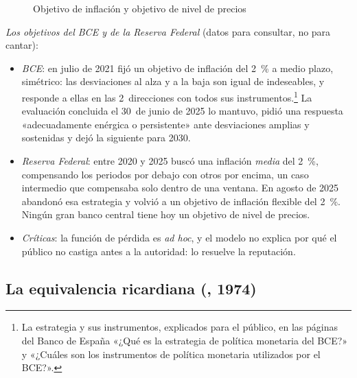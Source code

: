 \documentclass[11pt]{article}
\begin{document}
\begin{figure}[H]
\centering
\caption{Objetivo de inflación y objetivo de nivel de precios}\label{fig:objetivo-precios}
\end{figure}

\begin{anotaciones}
\emph{Los objetivos del BCE y de la Reserva Federal} (datos para consultar, no para cantar):
\begin{itemize}
\item \emph{BCE}: en julio de 2021 fijó un objetivo de inflación del 2~\% a medio plazo, simétrico: las desviaciones al alza y a la baja son igual de indeseables, y responde a ellas en las 2~direcciones con todos sus instrumentos\nocite{BCE2021Estrategia}.\footnote{La estrategia y sus instrumentos, explicados para el público, en las páginas del Banco de España «¿Qué es la estrategia de política monetaria del BCE?» y «¿Cuáles son los instrumentos de política monetaria utilizados por el BCE?»\nocite{BdE2026EstrategiaBCE,BdE2026InstrumentosBCE}.} La evaluación concluida el 30~de junio de 2025 lo mantuvo, pidió una respuesta «adecuadamente enérgica o persistente» ante desviaciones amplias y sostenidas y dejó la siguiente para 2030\nocite{BCE2025Estrategia,BCE2025Evaluacion}.
\item \emph{Reserva Federal}: entre 2020 y 2025 buscó una inflación \emph{media} del 2~\%, compensando los periodos por debajo con otros por encima, un caso intermedio que compensaba solo dentro de una ventana. En agosto de 2025 abandonó esa estrategia y volvió a un objetivo de inflación flexible del 2~\%\nocite{Fed2025Prensa,Powell2025Jackson}. Ningún gran banco central tiene hoy un objetivo de nivel de precios.
\end{itemize}
\end{anotaciones}

\begin{itemize}
\item \emph{Críticas}: la función de pérdida es \emph{ad hoc}, y el modelo no explica por qué el público no castiga antes a la autoridad: lo resuelve la reputación.
\end{itemize}

\subsection{La equivalencia ricardiana (, 1974)}\label{sec:ricardiana}
\end{document}
